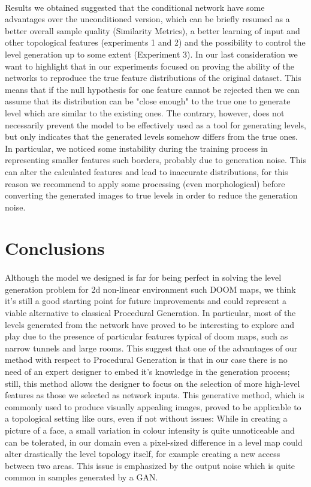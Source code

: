\paragraph{} Results we obtained suggested that the conditional network have some advantages over the unconditioned version, which can be briefly resumed as a better overall sample quality (Similarity Metrics), a better learning of input and other topological features (experiments 1 and 2) and the possibility to control the level generation up to some extent (Experiment 3). In our last consideration we want to highlight that in our experiments focused on proving the ability of the networks to reproduce the true feature distributions of the original dataset. This means that if the null hypothesis for one feature cannot be rejected then we can assume that its distribution can be "close enough" to the true one to generate level which are similar to the existing ones. The contrary, however, does not necessarily prevent the model to be effectively used as a tool for generating levels, but only indicates that the generated levels somehow differs from the true ones. In particular, we noticed some instability during the training process in representing smaller features such borders, probably due to generation noise. This can alter the calculated features and lead to inaccurate distributions, for this reason we recommend to apply some processing (even morphological) before converting the generated images to true levels in order to reduce the generation noise.

\section{Conclusions}
\label{sec:conclusions}
\paragraph{} Although the model we designed is far for being perfect in solving the level generation problem for 2d non-linear environment such DOOM maps, we think it's still a good starting point for future improvements and could represent a viable alternative to classical Procedural Generation. In particular, most of the levels generated from the network have proved to be interesting to explore and play due to the presence of particular features typical of doom maps, such as narrow tunnels and large rooms. This suggest that one of the advantages of our method with respect to Procedural Generation is that in our case there is no need of an expert designer to embed it's knowledge in the generation process; still, this method allows the designer to focus on the selection of more high-level features as those we selected as network inputs. This generative method, which is commonly used to produce visually appealing images, proved to be applicable to a topological setting like ours, even if not without issues: While in creating a picture of a face, a small variation in colour intensity is quite unnoticeable and can be tolerated, in our domain even a pixel-sized difference in a level map could alter drastically the level topology itself, for example creating a new access between two areas. This issue is emphasized by the output noise which is quite common in samples generated by a GAN.

